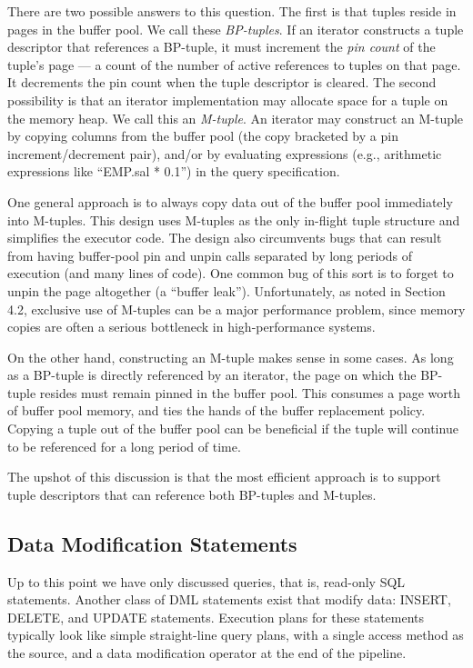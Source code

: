 \documentclass[b5paper,11pt,twoside,openright]{book}
\begin{document}
There are two possible answers to this question. The first is that
tuples reside in pages in the buffer pool. We call these
\emph{BP-tuples}. If an iterator constructs a tuple descriptor that
references a BP-tuple, it must
increment the \emph{pin count} of the tuple's page --- a count of the
number of active references to tuples on that page. It decrements the
pin count when the tuple descriptor is cleared. The second possibility
is that an iterator implementation may allocate space for a tuple on the
memory heap. We call this an \emph{M-tuple}. An iterator may construct
an M-tuple by copying columns from the buffer pool (the copy bracketed
by a pin increment/decrement pair), and/or by evaluating expressions
(e.g., arithmetic expressions like ``EMP.sal * 0.1'') in the
query specification.

One general approach is to always copy data out of the buffer pool
immediately into M-tuples. This design uses M-tuples as the only
in-flight tuple structure and simplifies the executor code. The design
also circumvents bugs that can result from having buffer-pool pin and
unpin calls separated by long periods of execution (and many lines of
code). One common bug of this sort is to forget to unpin the page
altogether (a ``buffer leak''). Unfortunately, as noted in Section 4.2,
exclusive use of M-tuples can be a major performance problem, since
memory copies are often a serious bottleneck in high-performance
systems.

On the other hand, constructing an M-tuple makes sense in some cases. As
long as a BP-tuple is directly referenced by an iterator, the page on
which the BP-tuple resides must remain pinned in the buffer pool. This
consumes a page worth of buffer pool memory, and ties the hands of the
buffer replacement policy. Copying a tuple out of the buffer pool can be
beneficial if the tuple will continue to be referenced for a long period
of time.

The upshot of this discussion is that the most efficient approach is to
support tuple descriptors that can reference both BP-tuples and
M-tuples.

\hypertarget{data-modification-statements}{%
\subsection{Data Modification
Statements}\label{data-modification-statements}}

Up to this point we have only discussed queries, that is, read-only SQL
statements. Another class of DML statements exist that modify data:
INSERT, DELETE, and UPDATE statements. Execution plans for these
statements typically look like simple straight-line query plans, with a
single access method as the source, and a data modification operator at
the end of the pipeline.
\end{document}

